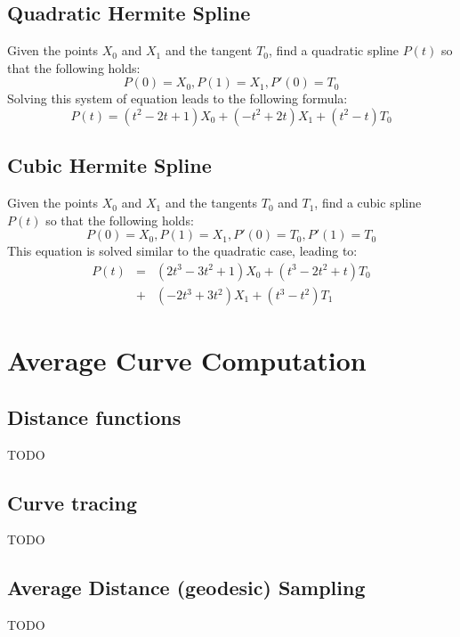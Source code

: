 \documentclass[journal, letterpaper]{IEEEtran}
\begin{document}
\subsection{Quadratic Hermite Spline}
Given the points $X_0$ and $X_1$ and the tangent $T_0$, find a quadratic spline $P(t)$ so that the following holds:
\begin{equation}
 P(0)=X_0, P(1)=X_1, P'(0)=T_0
\end{equation}
Solving this system of equation leads to the following formula:
\begin{equation}
 P(t) = (t^2-2t+1)X_0 + (-t^2+2t)X_1 + (t^2-t)T_0
\label{eq:QuadraticHermite}
\end{equation}

\subsection{Cubic Hermite Spline}
Given the points $X_0$ and $X_1$ and the tangents $T_0$ and $T_1$, find a cubic spline $P(t)$ so that the following holds:
\begin{equation}
 P(0)=X_0, P(1)=X_1, P'(0)=T_0, P'(1)=T_0
\end{equation}
This equation is solved similar to the quadratic case, leading to:
\begin{equation}
\begin{array}{rcl}
	P(t) &=& (2t^3-3t^2+1)X_0 + (t^3-2t^2+t)T_0 \\
	     &+& (-2t^3+3t^2)X_1 + (t^3-t^2)T_1
\end{array}
\label{eq:CubicHermite}
\end{equation}

\section{Average Curve Computation}\label{chapter:Tracing}

\subsection{Distance functions}
TODO

\subsection{Curve tracing}
TODO

\subsection{Average Distance (geodesic) Sampling}
TODO
\end{document}
